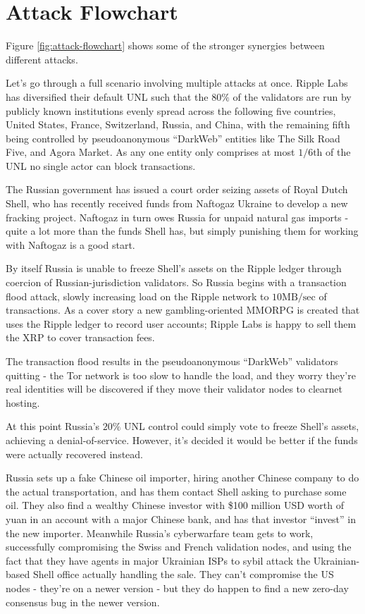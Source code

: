 \documentclass{article}
\begin{document}
\begin{itemize}
\end{itemize}


\section{Attack Flowchart}

Figure \ref{fig:attack-flowchart} shows some of the stronger synergies between
different attacks.

Let's go through a full scenario involving multiple attacks at once.  Ripple
Labs has diversified their default UNL such that the $80\%$ of the validators
are run by publicly known institutions evenly spread across the following five
countries, United States, France, Switzerland, Russia, and China, with the
remaining fifth being controlled by pseudoanonymous ``DarkWeb'' entities like
The Silk Road Five, and Agora Market. As any one entity only comprises at most
$1/6\text{th}$ of the UNL no single actor can block transactions.

The Russian government has issued a court order seizing assets of Royal Dutch
Shell, who has recently received funds from Naftogaz Ukraine to develop a new
fracking project. Naftogaz in turn owes Russia for unpaid natural gas imports -
quite a lot more than the funds Shell has, but simply punishing them for
working with Naftogaz is a good start.

By itself Russia is unable to freeze Shell's assets on the Ripple ledger
through coercion of Russian-jurisdiction validators. So Russia begins with a
transaction flood attack, slowly increasing load on the Ripple network to
$10\text{MB}/\text{sec}$ of transactions. As a cover story a new
gambling-oriented MMORPG is created that uses the Ripple ledger to record user
accounts; Ripple Labs is happy to sell them the XRP to cover transaction fees.

The transaction flood results in the pseudoanonymous ``DarkWeb'' validators
quitting - the Tor network is too slow to handle the load, and they worry
they're real identities will be discovered if they move their validator nodes
to clearnet hosting.

At this point Russia's $20\%$ UNL control could simply vote to freeze Shell's
assets, achieving a denial-of-service. However, it's decided it would be better
if the funds were actually recovered instead.

Russia sets up a fake Chinese oil importer, hiring another Chinese company to
do the actual transportation, and has them contact Shell asking to purchase
some oil. They also find a wealthy Chinese investor with \$100 million USD
worth of yuan in an account with a major Chinese bank, and has that investor
``invest'' in the new importer. Meanwhile Russia's cyberwarfare team gets to
work, successfully compromising the Swiss and French validation nodes, and
using the fact that they have agents in major Ukrainian ISPs to sybil attack
the Ukrainian-based Shell office actually handling the sale. They can't
compromise the US nodes - they're on a newer version - but they do happen to
find a new zero-day consensus bug in the newer version.
\end{document}
